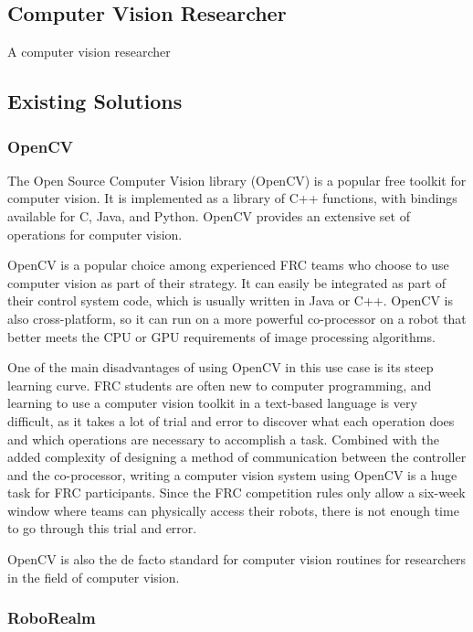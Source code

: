 \documentclass[12pt]{article}
\begin{document}
\subsection{Computer Vision Researcher}
A computer vision researcher

\subsection{Existing Solutions}

\subsubsection{OpenCV}
The Open Source Computer Vision library (OpenCV) is a popular free toolkit for computer vision.  It is implemented as a library of C++ functions, with bindings available for C, Java, and Python.  OpenCV provides an extensive set of operations for computer vision.

\par
OpenCV is a popular choice among experienced FRC teams who choose to use computer vision as part of their strategy.  It can easily be integrated as part of their control system code, which is usually written in Java or C++.  OpenCV is also cross-platform, so it can run on a more powerful co-processor on a robot that better meets the CPU or GPU requirements of image processing algorithms.
\par
One of the main disadvantages of using OpenCV in this use case is its steep learning curve.  FRC students are often new to computer programming, and learning to use a computer vision toolkit in a text-based language is very difficult, as it takes a lot of trial and error to discover what each operation does and which operations are necessary to accomplish a task.  Combined with the added complexity of designing a method of communication between the controller and the co-processor, writing a computer vision system using OpenCV is a huge task for FRC participants.  Since the FRC competition rules only allow a six-week window where teams can physically access their robots, there is not enough time to go through this trial and error.

\par
OpenCV is also the de facto standard for computer vision routines for researchers in the field of computer vision.


\subsubsection{RoboRealm}
\end{document}
